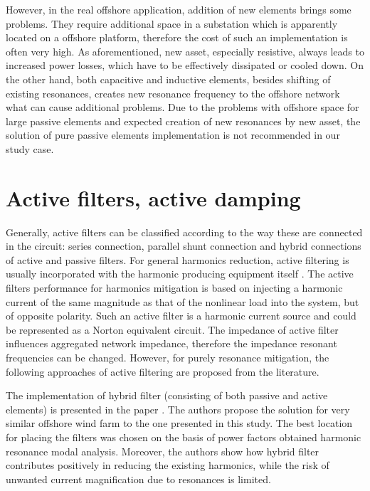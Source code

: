 \documentclass[a4paper,11pt,twoside]{report} %
\begin{document}
However, in the real offshore application, addition of new elements brings some problems. They require additional space in a substation which is apparently located on a offshore platform, therefore the cost of such an implementation is often very high. As aforementioned, new asset, especially resistive, always leads to increased power losses, which have to be effectively dissipated or cooled down. On the other hand, both capacitive and inductive elements, besides shifting of existing resonances, creates new resonance frequency to the offshore network what can cause additional problems. Due to the problems with offshore space for large passive elements and expected creation of new resonances by new asset, the solution of pure passive elements implementation is not recommended in our study case.

\section{Active filters, active damping}
Generally, active filters can be classified according to the way these are connected in the circuit: series connection, parallel shunt connection and hybrid connections of active and passive filters. For general harmonics reduction, active filtering is usually incorporated with the harmonic producing equipment itself \cite{das}. The active filters performance for harmonics mitigation is based on injecting a harmonic current of the same magnitude as that of the nonlinear load into the system, but of opposite polarity. Such an active filter is a harmonic current source and could be represented as a Norton equivalent circuit. The impedance of active filter influences aggregated network impedance, therefore the impedance resonant frequencies can be changed. However, for purely resonance mitigation, the following approaches of active filtering are proposed from the literature.

The implementation of hybrid filter (consisting of both passive and active elements) is presented in the paper \cite{hasan2014}. The authors propose the solution for very similar offshore wind farm to the one presented in this study. The best location for placing the filters was chosen on the basis of power factors obtained harmonic resonance modal analysis. Moreover, the authors show how hybrid filter contributes positively in reducing the existing harmonics, while the risk of unwanted current magnification due to resonances is limited.
\end{document}
